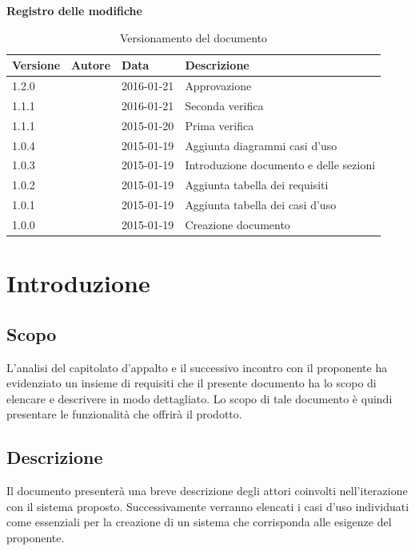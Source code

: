 \documentclass[12pt,a4paper]{article}
\begin{document}
\Large{\textbf{Registro delle modifiche}}\\
\normalsize

\begin{table}[H]
	\begin{center}
		\begin{tabular}{p{} p{} p{} p{}}
			\toprule
			\textbf{Versione}	&	\textbf{Autore}	&	\textbf{Data}	&	\textbf{Descrizione}\\
			\midrule
			\midrule
			1.2.0 & \NDC{} & 2016-01-21 &  Approvazione \\
			\midrule
			1.1.1 & \IB{} & 2016-01-21 &  Seconda verifica \\
			\midrule
			1.1.1 & \AVI{} & 2015-01-20 &  Prima verifica \\
			\midrule
            1.0.4 & \TP{} & 2015-01-19 & Aggiunta diagrammi casi d'uso\\
            \midrule
			1.0.3 & \AVE{} & 2015-01-19 &  Introduzione documento e delle sezioni  \\
			\midrule
			1.0.2 & \AB{} & 2015-01-19 &  Aggiunta tabella dei requisiti \\
			\midrule
			1.0.1 & \WS{} & 2015-01-19 &  Aggiunta tabella dei casi d'uso \\
			\midrule
			1.0.0 & \NDC{} & 2015-01-19 &  Creazione documento \\
			\bottomrule
		\end{tabular}
		\caption{Versionamento del documento}
		\label{tabVers1}
	\end{center}
\end{table}
\newpage

\tableofcontents
\listoftables
\newpage

\section{Introduzione}

\subsection{Scopo}
L’analisi del capitolato d’appalto e il successivo incontro con il proponente ha evidenziato un insieme di requisiti che il presente documento ha lo scopo di elencare e descrivere in modo dettagliato. Lo scopo di tale documento è quindi presentare le funzionalità che offrirà il prodotto.

\subsection{Descrizione}
Il documento presenterà una breve descrizione degli attori coinvolti nell'iterazione con il sistema proposto. Successivamente verranno elencati i casi d'uso individuati come essenziali per la creazione di un sistema che corrisponda alle esigenze del proponente.
\end{document}
